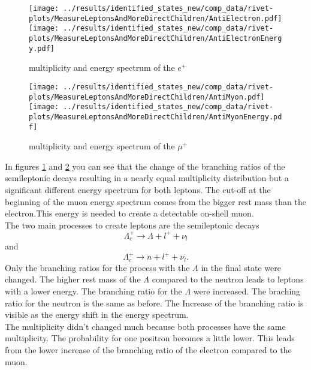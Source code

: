 \begin{figure}[h]
  \centering
  \texttt{[image: ../results/identified\_states\_new/comp\_data/rivet-plots/MeasureLeptonsAndMoreDirectChildren/AntiElectron.pdf]}
  \texttt{[image: ../results/identified\_states\_new/comp\_data/rivet-plots/MeasureLeptonsAndMoreDirectChildren/AntiElectronEnergy.pdf]}
  \caption{multiplicity and energy spectrum of the \(e^+\)} \label{gr:prim-ep}
\end{figure}
\begin{figure}[h]
  \centering
  \texttt{[image: ../results/identified\_states\_new/comp\_data/rivet-plots/MeasureLeptonsAndMoreDirectChildren/AntiMyon.pdf]}
  \texttt{[image: ../results/identified\_states\_new/comp\_data/rivet-plots/MeasureLeptonsAndMoreDirectChildren/AntiMyonEnergy.pdf]}
  \caption{multiplicity and energy spectrum of the \(\mu^+\)} \label{gr:prim-mup}
\end{figure}
In figures {\ref{gr:prim-ep}} and {\ref{gr:prim-mup}} you can see that 
the change of the branching ratios of the semileptonic decays 
resulting in a nearly equal multiplicity distribution but a significant different 
energy spectrum for both leptons. The cut-off at the beginning of the muon 
energy spectrum comes from the bigger rest mass than the electron.This energy is 
needed to create a detectable on-shell muon.\\
The two main processes to create leptons are the semileptonic decays
\begin{equation}
  \Lambda_c^+ \rightarrow \Lambda + l^+ + \nu_l \nonumber
\end{equation} and 
\begin{equation}
  \Lambda_c^+ \rightarrow n+ l^+ + \nu_l. \nonumber
\end{equation}
Only the branching ratios for the process with the \(\Lambda\) in the final state were changed. 
The higher rest mass of the \(\Lambda\) compared to the neutron leads to leptons 
with a lower energy. The branching ratio for the \(\Lambda\) were increased. The 
braching ratio for the neutron is the same as before. The Increase of the 
branching ratio is visible as the energy shift in the energy spectrum.\\
The multiplicity didn't changed much because both processes have the same 
multiplicity. The probability for one positron becomes a little lower. This 
leads from the lower increase of the branching ratio of the electron compared 
to the muon.\\
